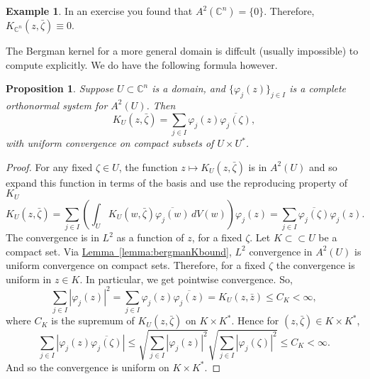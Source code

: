 \documentclass[12pt,openany]{book}
\newcommand{\abs}[1]{\left\lvert {#1} \right\rvert}
\newcommand{\C}{{\mathbb{C}}}
\theoremstyle{plain}
\newtheorem{prop}[thm]{Proposition}
\theoremstyle{remark}
\theoremstyle{definition}
\theoremstyle{exercise}
\theoremstyle{example}
\newtheorem{example}[thm]{Example}
\newcommand{\lemmaref}[1]{\hyperref[#1]{Lemma~\ref*{#1}}}
\begin{document}
\begin{example}
In an exercise you found that
$A^2(\C^n) = \{ 0 \}$.  Therefore, 
$K_{\C^n}(z,\bar{\zeta}) \equiv 0$.
\end{example}

The Bergman kernel for a more general domain is diffcult (usually impossible)
to compute explicitly.  We do have the following formula however.

\begin{prop}
Suppose $U \subset \C^n$ is a domain, and
$\{ \varphi_j (z) \}_{j\in I}$ is a complete orthonormal system
for $A^2(U)$.  Then
\begin{equation*}
K_U(z,\bar{\zeta})
=
\sum_{j \in I} \varphi_j(z) \overline{\varphi_j(\zeta)} ,
\end{equation*}
with uniform convergence on compact subsets of $U \times U^*$.
\end{prop}

\begin{proof}
For any fixed $\zeta \in U$, the function $z \mapsto K_U(z,\bar{\zeta})$ is
in $A^2(U)$ and so expand this function
in terms of the basis and use the reproducing property of $K_U$
\begin{equation*}
K_U(z,\bar{\zeta}) = 
\sum_{j \in I}
\left(\int_U K_U(w,\bar{\zeta}) \overline{\varphi_j(w)} \, dV(w) \right)
\varphi_j(z)
=
\sum_{j \in I}
\overline{\varphi_j(\zeta)}
\varphi_j(z) .
\end{equation*}
The convergence is in $L^2$ as a function of $z$, for a fixed $\zeta$.
Let $K \subset \subset U$ be a compact set.
Via \lemmaref{lemma:bergmanKbound}, $L^2$ convergence in $A^2(U)$ is uniform convergence on
compact sets.  Therefore, for a fixed $\zeta$ the convergence is uniform in
$z \in K$.  In particular, we get pointwise convergence.  So,
\begin{equation*}
\sum_{j \in I}
\abs{
\varphi_j(z) 
}^2
=
\sum_{j \in I}
\varphi_j(z) 
\overline{\varphi_j(z)}
=
K_U(z,\bar{z})
\leq C_K < \infty ,
\end{equation*}
where $C_K$ is the supremum of $K_U(z,\bar{\zeta})$ on $K \times K^*$.
Hence for $(z,\bar{\zeta}) \in K \times K^*$,
\begin{equation*}
\sum_{j \in I}
\abs{
\varphi_j(z)
\overline{\varphi_j(\zeta)}
}
\leq
\sqrt{
\sum_{j \in I}
\abs{
\varphi_j(z)
}^2
}
\sqrt{
\sum_{j \in I}
\abs{
\varphi_j(\zeta)
}^2
}
\leq
C_K < \infty .
\end{equation*}
And so the convergence is uniform on $K \times K^*$.
\end{proof}
\end{document}
